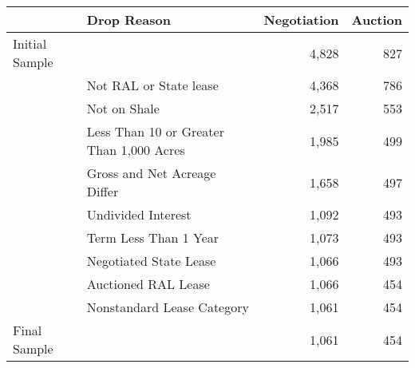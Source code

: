 
\begin{tabular}{llrr}
\toprule
 & Drop Reason & Negotiation & Auction\\
\midrule
Initial Sample &  & 4,828 & 827\\
 & Not RAL or State lease & 4,368 & 786\\
 & Not on Shale & 2,517 & 553\\
 & Less Than 10 or Greater Than 1,000 Acres & 1,985 & 499\\
 & Gross and Net Acreage Differ & 1,658 & 497\\
 & Undivided Interest & 1,092 & 493\\
 & Term Less Than 1 Year & 1,073 & 493\\
 & Negotiated State Lease & 1,066 & 493\\
 & Auctioned RAL Lease & 1,066 & 454\\
 & Nonstandard Lease Category & 1,061 & 454\\
Final Sample &  & 1,061 & 454\\
\bottomrule
\end{tabular}
